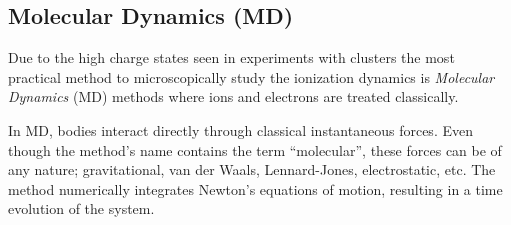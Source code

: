 

\subsection{Molecular Dynamics (MD)}
\label{section:tools:md}

Due to the high charge states seen in experiments with clusters the most
practical method to microscopically study the ionization dynamics is
\textit{Molecular Dynamics} (MD) methods where ions and electrons are treated
classically.

In MD, bodies interact directly through classical instantaneous forces. Even
though the method's name contains the term ``molecular'', these forces can be
of any nature; gravitational, van der Waals, Lennard-Jones, electrostatic, etc.
The method numerically integrates Newton's equations of motion, resulting in a
time evolution of the system.

